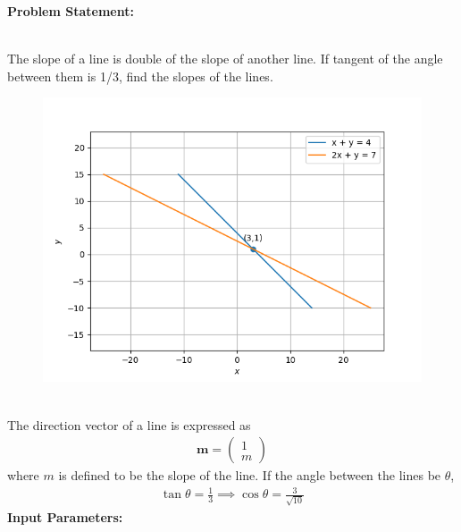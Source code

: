 \documentclass[10pt,a4paper]{report}
\newcommand{\myvec}[1]{\ensuremath{\begin{pmatrix}#1\end{pmatrix}}}
\let\vec\mathbf
\let\vec\mathbf
\begin{document}
\begin{multicols}{2}

\raggedright \textbf{Problem Statement:}\vspace{2mm}
\raggedright \\
\fi
	The slope of a line is double of the slope of another line. If tangent of the angle between them is 1/3, find the slopes of the lines.
	\begin{figure}[!ht]
		\centering
 \includegraphics[width=\columnwidth]{chapters/11/10/1/11/figs/line.png}
		\caption{}
		\label{fig:11/10/1/11}
  	\end{figure}

\\
\solution 
The direction vector of a line is expressed as
\begin{align}
\vec{m}=\myvec{1\\m}
\end{align}
where  $m$ is defined to be the slope of the line. If the angle between the lines be $\theta$,
\begin{align}
\tan \theta = \frac{1}{3}
\implies \cos \theta=\frac{3}{\sqrt{10}}
\end{align}
\iffalse
\textbf{Input Parameters:}
\vspace{2mm}



\end{multicols}
\end{document}
